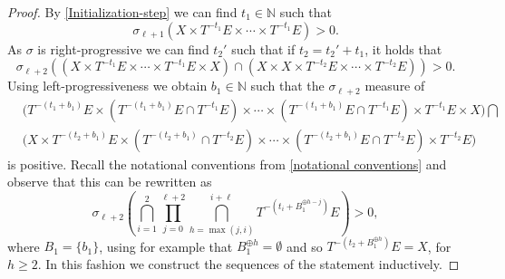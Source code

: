 \documentclass[letter, 11pt]{article}
\theoremstyle{definition}
\theoremstyle{plain}
\newcommand{\N}{\mathbb{N}}
\newcommand{\1}{\mathbbm{1}}
\begin{document}
\begin{proof}
    By \cref{Initialization-step} we can find $t_1\in \N$ such that 
    $$\sigma_{\ell+1}(X\times T^{-t_1}E \times\cdots \times T^{-t_1}E)>0. $$
    As $\sigma$ is right-progressive we can find $t_2'$ such that if $t_2=t_2'+t_1$, it holds that 
    $$\sigma_{\ell+2}( (X\times T^{-t_1}E \times\cdots \times T^{-t_1}E \times X)\cap (X\times X\times T^{-t_2}E \times\cdots \times T^{-t_2}E)) >0. $$
    Using left-progressiveness we obtain $b_1\in \N$ such that the $\sigma_{\ell+2}$ measure of  
    \begin{align*}
       &\Big(T^{-(t_1+b_1)}E \times \left( T^{-(t_1+b_1)}E \cap T^{-t_1}E \right) \times \cdots \times \left( T^{-(t_1+b_1)}E\cap T^{-t_1}E \right) \times T^{-t_1}E \times X \Big) \bigcap \\
       & \Big( X\times T^{-(t_2+b_1)}E \times \left( T^{-(t_2+b_1)} \cap T^{-t_2}E \right) \times \cdots \times \left( T^{-(t_2+b_1)}E\cap T^{-t_2}E \right) \times T^{-t_2}E \Big) 
    \end{align*}
    is positive. Recall the notational conventions from \cref{notational conventions} and observe that this can be rewritten as 
    $$\sigma_{\ell+2}\left(\bigcap_{i=1}^{2}  \prod_{j=0}^{\ell+2}\bigcap_{h=\max(j,i)}^{i+\ell}  T^{-\left( t_i+ B_1^{\oplus h-j} \right)}  E   \right)>0,$$
    where $B_1=\{b_1\}$, using for example that $B_1^{\oplus h}=\emptyset$ and so $T^{-(t_2+B_1^{\oplus h})}E=X$, for $h\geq 2$. In this fashion we   construct the sequences of the statement inductively.


\end{proof}
\end{document}
